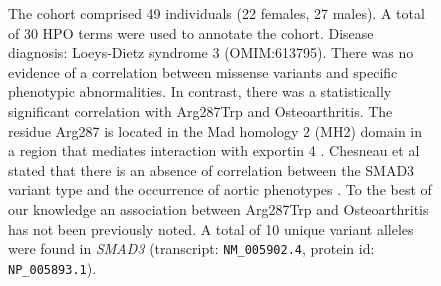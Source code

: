 \begin{figure}[htbp]
\vspace{2em}

\caption{ The cohort comprised 49 individuals (22 females, 27 males). 
A total of 30 HPO terms were used to annotate the cohort. Disease diagnosis: Loeys-Dietz syndrome 3 
(OMIM:613795). There was no evidence of a correlation between missense variants and specific 
phenotypic abnormalities. In contrast, there was a statistically significant correlation with 
Arg287Trp and Osteoarthritis. The residue Arg287 is located in the Mad homology 2 (MH2) domain in a 
region that mediates interaction with exportin 4 \cite{PMID_16449645}.
Chesneau et al stated that there is an absence of correlation between the SMAD3 variant type and the occurrence of aortic phenotypes \cite{PMID_32154675}.
To the best of our knowledge an association between Arg287Trp and Osteoarthritis has not been previously noted.
A total of 10 unique variant alleles were found in \textit{SMAD3} (transcript: \texttt{NM\_005902.4}, protein id: \texttt{NP\_005893.1}).}
\end{figure}

